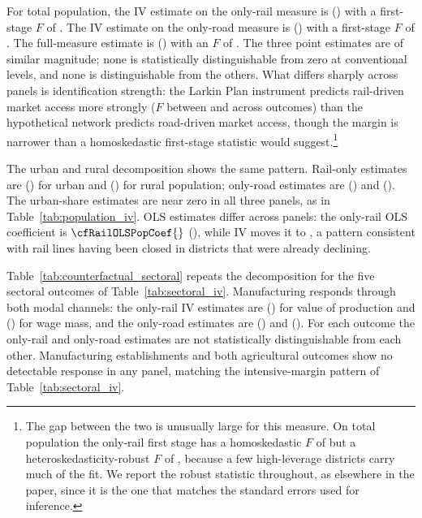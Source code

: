 For total population, the IV estimate on the only-rail measure is
\cfRailCoefIVPop{} (\cfRailSEIVPop{}) with a first-stage $F$ of
\cfRailFIVPop{}. The IV estimate on the only-road measure is
\cfRoadCoefIVPop{} (\cfRoadSEIVPop{}) with a first-stage $F$ of
\cfRoadFIVPop{}. The full-measure estimate is \mainPopCoefIVBoth{}
(\mainPopSEIVBoth{}) with an $F$ of \cfFullFIVPop{}. The
three point estimates are of similar magnitude; none is statistically
distinguishable from zero at conventional levels, and none is
distinguishable from the others. What differs sharply across panels is
identification strength: the Larkin Plan instrument predicts
rail-driven market access more strongly ($F$ between \cfRailFMin{} and
\cfRailFMax{} across outcomes) than the hypothetical network predicts
road-driven market access, though the margin is narrower than a
homoskedastic first-stage statistic would suggest.\footnote{The gap
between the two is unusually large for this measure. On total
population the only-rail first stage has a homoskedastic $F$ of
\cfRailFIVPopIID{} but a heteroskedasticity-robust $F$ of
\cfRailFIVPop{}, because a few
high-leverage districts carry much of the fit. We report the robust
statistic throughout, as elsewhere in the paper, since it is the one
that matches the standard errors used for inference.}



The urban and rural decomposition shows the same pattern. Rail-only
estimates are \cfRailUrbCoef{} (\cfRailUrbSE{}) for urban and \cfRailRurCoef{} (\cfRailRurSE{}) for rural
population; only-road estimates are \cfRoadUrbCoef{} (\cfRoadUrbSE{}) and \cfRoadRurCoef{} (\cfRoadRurSE{}).
The urban-share estimates are near zero in all three panels, as in
Table~\ref{tab:population_iv}. OLS estimates differ across panels: the
only-rail OLS coefficient is $\cfRailOLSPopCoef{}$ (\cfRailOLSPopSE{}), while IV moves it to
\cfRailCoefIVPop{}, a pattern consistent with rail lines having been closed in
districts that were already declining.

Table~\ref{tab:counterfactual_sectoral} repeats the decomposition for
the five sectoral outcomes of Table~\ref{tab:sectoral_iv}.
Manufacturing responds through both modal channels: the only-rail IV
estimates are \cfRailMfgValCoef{} (\cfRailMfgValSE{}) for value of
production and \cfRailMfgWageCoef{} (\cfRailMfgWageSE{}) for wage
mass, and the only-road estimates are \cfRoadMfgValCoef{}
(\cfRoadMfgValSE{}) and \cfRoadMfgWageCoef{} (\cfRoadMfgWageSE{}).
For each outcome the only-rail and only-road estimates are not
statistically distinguishable from each other.
Manufacturing establishments and both agricultural outcomes show no
detectable response in any panel, matching the intensive-margin
pattern of Table~\ref{tab:sectoral_iv}.

